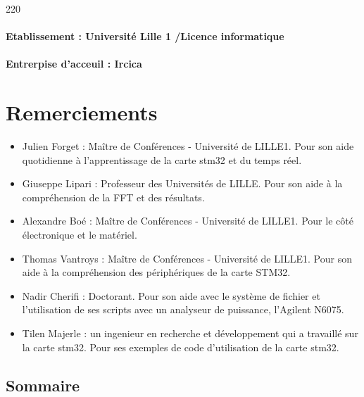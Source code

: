 \documentclass[a4paper]{article}
\begin{document}
\begin{titlepage}
\begin{textblock}{220}
\paragraph{Etablissement : Université Lille 1 /Licence informatique }
\paragraph{Entrerpise d'acceuil : Ircica }
\paragraph{}
\end{textblock}


\end{titlepage}


\section{Remerciements}

\begin{itemize}
\item{Julien Forget : Maître de Conférences - Université de LILLE1.} Pour son aide quotidienne à l'apprentissage de la carte stm32 et du temps réel. 
\item{Giuseppe Lipari : Professeur des Universités de LILLE.} Pour son aide à la compréhension de la FFT et des résultats. 
\item{Alexandre Boé : Maître de Conférences - Université de LILLE1.} Pour le côté électronique et le matériel.
\item{Thomas Vantroys : Maître de Conférences - Université de LILLE1.} Pour son aide à la compréhension des périphériques de la carte STM32. 
\item{Nadir Cherifi : Doctorant.} Pour son aide avec le système de fichier et l'utilisation de ses scripts avec un analyseur de puissance, l'Agilent N6075. 
\item{Tilen Majerle : un ingenieur en recherche et développement qui a travaillé sur la carte stm32.} Pour ses exemples de code d'utilisation de la carte stm32. 
\end{itemize}



\begin{titlepage}

\section{Sommaire}

\tableofcontents


\end{titlepage}
\end{document}

